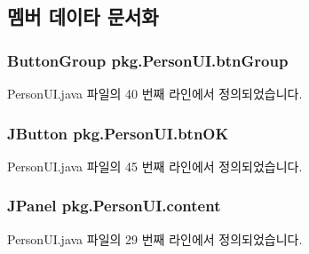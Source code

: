 \subsection{멤버 데이타 문서화}
\subsubsection[{\texorpdfstring{btn\+Group}{btnGroup}}]{\setlength{\rightskip}{0pt plus 5cm}Button\+Group pkg.\+Person\+U\+I.\+btn\+Group\hspace{0.3cm}{\ttfamily [private]}}\hypertarget{classpkg_1_1_person_u_i_ab021b25096eb0dec11276a56b226dc42}{}\label{classpkg_1_1_person_u_i_ab021b25096eb0dec11276a56b226dc42}


Person\+U\+I.\+java 파일의 40 번째 라인에서 정의되었습니다.

\subsubsection[{\texorpdfstring{btn\+OK}{btnOK}}]{\setlength{\rightskip}{0pt plus 5cm}J\+Button pkg.\+Person\+U\+I.\+btn\+OK\hspace{0.3cm}{\ttfamily [private]}}\hypertarget{classpkg_1_1_person_u_i_ac8976435621b24ee0012f2553d5e168d}{}\label{classpkg_1_1_person_u_i_ac8976435621b24ee0012f2553d5e168d}


Person\+U\+I.\+java 파일의 45 번째 라인에서 정의되었습니다.

\subsubsection[{\texorpdfstring{content}{content}}]{\setlength{\rightskip}{0pt plus 5cm}J\+Panel pkg.\+Person\+U\+I.\+content\hspace{0.3cm}{\ttfamily [private]}}\hypertarget{classpkg_1_1_person_u_i_a05931d9e728132b35d239a5229eea21d}{}\label{classpkg_1_1_person_u_i_a05931d9e728132b35d239a5229eea21d}


Person\+U\+I.\+java 파일의 29 번째 라인에서 정의되었습니다.

